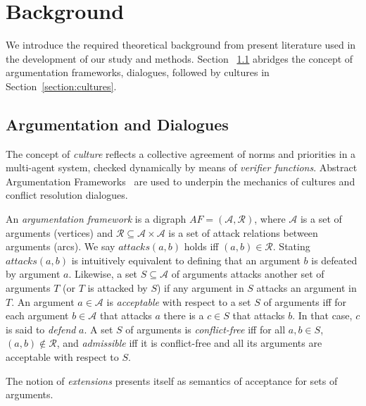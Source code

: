 \documentclass[acmsmall]{custom-arxiv}  %
\begin{document}
\section{Background}
\label{section:background}

We introduce the required theoretical background from present literature used in the development of our study and methods. Section ~\ref{section:argumentation} abridges the concept of argumentation frameworks, dialogues, followed by cultures in Section~\ref{section:cultures}.

\subsection{Argumentation and Dialogues}
\label{section:argumentation}



The concept of \textit{culture} \citep{Raymond2020Culture-BasedDeconfliction} reflects a collective agreement of norms and priorities in a multi-agent system, checked dynamically by means of \textit{verifier functions}. Abstract Argumentation Frameworks~\citep{Dung1995OnGames} are used to underpin the mechanics of cultures and conflict resolution dialogues. 



\begin{definition} 
An \emph{argumentation framework} is a digraph $AF = (\mathcal{A}, \mathcal{R})$, where $\mathcal{A}$ is a set of arguments (vertices) and $\mathcal{R} \subseteq \mathcal{A} \times \mathcal{A}$ is a set of attack relations between arguments (arcs). We say $\textit{attacks}(a,b)$ holds iff $(a,b) \in \mathcal{R}$. Stating $\textit{attacks}(a,b)$ is intuitively equivalent to defining that an argument $b$ is defeated by argument $a$. Likewise, a set $S \subseteq \mathcal{A}$ of arguments attacks another set of arguments $T$ (or $T$ is attacked by $S$) if any argument in $S$ attacks an argument in $T$. An argument $a \in \mathcal{A}$ is \textit{acceptable} with respect to a set $S$ of arguments iff for each argument $b \in \mathcal{A}$ that attacks $a$ there is a $c \in S$ that attacks $b$. In that case, $c$ is said to \textit{defend} $a$. A set $S$ of arguments is \textit{conflict-free} iff for all $a, b \in S$, $(a,b) \not\in \mathcal{R}$, and \textit{admissible} iff it is conflict-free and all its arguments are acceptable with respect to $S$.
\end{definition}

The notion of \textit{extensions} \citep{Doutre2001PreferredComputation} presents itself as semantics of acceptance for sets of arguments.
\end{document}
